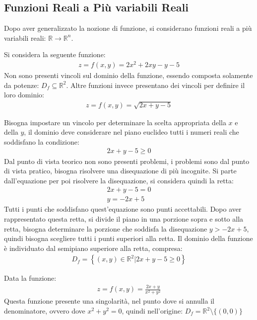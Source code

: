 \documentclass{article}
\numberwithin{equation}{subsection}
\begin{document}
\subsection{Funzioni Reali a Più variabili Reali}

Dopo aver generalizzato la nozione di funzione, si considerano funzioni reali a più variabili reali: $\mathbb{R}\to\mathbb{R}^n$. 


Si considera la seguente funzione:
\begin{gather*}
    z=f(x,y)=2x^2+2xy-y-5
\end{gather*}
Non sono presenti vincoli sul dominio della funzione, essendo composta solamente da potenze: $D_f\subseteq\mathbb{R}^2$. Altre funzioni invece presentano dei vincoli per definire il loro dominio:
\begin{gather*}
    z=f(x,y)=\sqrt{2x+y-5}
\end{gather*}

Bisogna impostare un vincolo per determinare la scelta appropriata della $x$ e della $y$, il dominio deve considerare nel piano euclideo tutti i numeri reali che soddisfano la condizione:
\begin{gather*}
    2x+y-5\geq0
\end{gather*}
Dal punto di vista teorico non sono presenti problemi, i problemi sono dal punto di vista pratico, bisogna risolvere una disequazione di più incognite. 
Si parte dall'equazione per poi risolvere la disequazione, si considera quindi la retta:
\begin{gather*}
    2x+y-5=0\\
    y=-2x+5
\end{gather*}
Tutti i punti che soddisfano quest'equazione sono punti accettabili. 
Dopo aver rappresentato questa retta, si divide il piano in una porzione sopra e sotto alla retta, bisogna determinare la porzione che soddisfa la disequazione $y>-2x+5$, quindi bisogna scegliere tutti i punti superiori alla retta. Il dominio della funzione è individuato dal semipiano superiore alla retta, compresa:
\begin{gather*}
    D_f=\left\{(x,y)\in\mathbb{R}^2\big| 2x+y-5\geq0\right\}
\end{gather*}

Data la funzione:
\begin{gather*}
    z=f(x,y)=\displaystyle\frac{2x+y}{x^2+y^2}
\end{gather*}
Questa funzione presente una singolarità, nel punto dove si annulla il denominatore, ovvero dove $x^2+y^2=0$, quindi nell'origine: $D_f=\mathbb{R}^2\setminus\{(0,0)\}$
\end{document}
